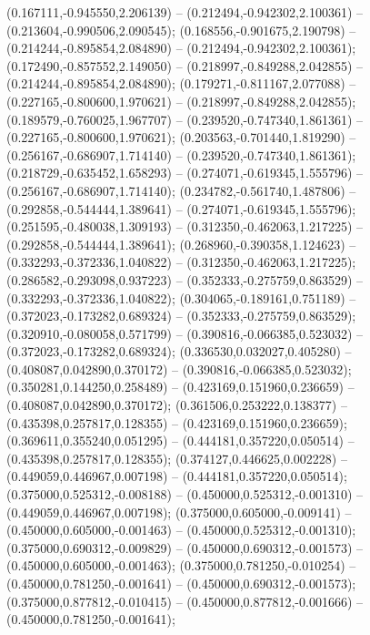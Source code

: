  (0.167111,-0.945550,2.206139) -- (0.212494,-0.942302,2.100361) -- (0.213604,-0.990506,2.090545);
 (0.168556,-0.901675,2.190798) -- (0.214244,-0.895854,2.084890) -- (0.212494,-0.942302,2.100361);
 (0.172490,-0.857552,2.149050) -- (0.218997,-0.849288,2.042855) -- (0.214244,-0.895854,2.084890);
 (0.179271,-0.811167,2.077088) -- (0.227165,-0.800600,1.970621) -- (0.218997,-0.849288,2.042855);
 (0.189579,-0.760025,1.967707) -- (0.239520,-0.747340,1.861361) -- (0.227165,-0.800600,1.970621);
 (0.203563,-0.701440,1.819290) -- (0.256167,-0.686907,1.714140) -- (0.239520,-0.747340,1.861361);
 (0.218729,-0.635452,1.658293) -- (0.274071,-0.619345,1.555796) -- (0.256167,-0.686907,1.714140);
 (0.234782,-0.561740,1.487806) -- (0.292858,-0.544444,1.389641) -- (0.274071,-0.619345,1.555796);
 (0.251595,-0.480038,1.309193) -- (0.312350,-0.462063,1.217225) -- (0.292858,-0.544444,1.389641);
 (0.268960,-0.390358,1.124623) -- (0.332293,-0.372336,1.040822) -- (0.312350,-0.462063,1.217225);
 (0.286582,-0.293098,0.937223) -- (0.352333,-0.275759,0.863529) -- (0.332293,-0.372336,1.040822);
 (0.304065,-0.189161,0.751189) -- (0.372023,-0.173282,0.689324) -- (0.352333,-0.275759,0.863529);
 (0.320910,-0.080058,0.571799) -- (0.390816,-0.066385,0.523032) -- (0.372023,-0.173282,0.689324);
 (0.336530,0.032027,0.405280) -- (0.408087,0.042890,0.370172) -- (0.390816,-0.066385,0.523032);
 (0.350281,0.144250,0.258489) -- (0.423169,0.151960,0.236659) -- (0.408087,0.042890,0.370172);
 (0.361506,0.253222,0.138377) -- (0.435398,0.257817,0.128355) -- (0.423169,0.151960,0.236659);
 (0.369611,0.355240,0.051295) -- (0.444181,0.357220,0.050514) -- (0.435398,0.257817,0.128355);
 (0.374127,0.446625,0.002228) -- (0.449059,0.446967,0.007198) -- (0.444181,0.357220,0.050514);
 (0.375000,0.525312,-0.008188) -- (0.450000,0.525312,-0.001310) -- (0.449059,0.446967,0.007198);
 (0.375000,0.605000,-0.009141) -- (0.450000,0.605000,-0.001463) -- (0.450000,0.525312,-0.001310);
 (0.375000,0.690312,-0.009829) -- (0.450000,0.690312,-0.001573) -- (0.450000,0.605000,-0.001463);
 (0.375000,0.781250,-0.010254) -- (0.450000,0.781250,-0.001641) -- (0.450000,0.690312,-0.001573);
 (0.375000,0.877812,-0.010415) -- (0.450000,0.877812,-0.001666) -- (0.450000,0.781250,-0.001641);
